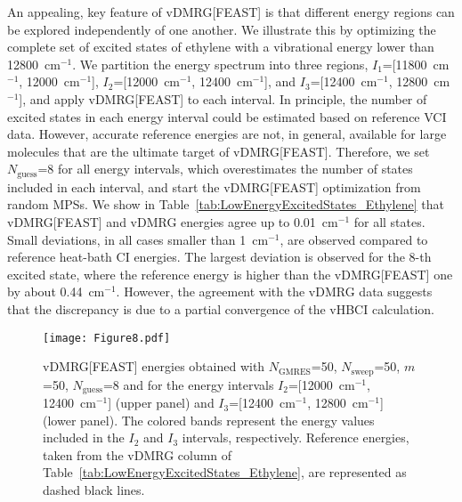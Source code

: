 \documentclass[journal=jctcce]{achemso}
\begin{document}
\noindent An appealing, key feature of vDMRG[FEAST] is that different energy regions can be explored independently of
one another.
We illustrate this by optimizing the complete set of excited states of ethylene with a vibrational energy lower than 12800~cm$^{-1}$.
We partition the energy spectrum into three regions, $I_1$=[11800~cm$^{-1}$, 12000~cm$^{-1}$], $I_2$=[12000~cm$^{-1}$, 12400~cm$^{-1}$], and $I_3$=[12400~cm$^{-1}$, 12800~cm$^{-1}$], and apply vDMRG[FEAST] to each interval.
In principle, the number of excited states in each energy interval could be estimated based on reference VCI data.\cite{Delahaye2014_EthylenePES} 
However, accurate reference energies are not, in general, available for large molecules that are the ultimate target of vDMRG[FEAST].
Therefore, we set $N_\text{guess}$=8 for all energy intervals, which overestimates the number of states included in each interval, and start the vDMRG[FEAST] optimization from random MPSs.
We show in Table~\ref{tab:LowEnergyExcitedStates_Ethylene} that vDMRG[FEAST] and vDMRG energies agree up to 0.01~cm$^{-1}$ for all states.
Small deviations, in all cases smaller than 1~cm$^{-1}$, are observed compared to reference heat-bath CI energies.\cite{Berkelbach2021_HBCI-Vibrational}
The largest deviation is observed for the 8-th excited state, where the reference energy is higher than the vDMRG[FEAST] one by about 0.44~cm$^{-1}$.
However, the agreement with the vDMRG data suggests that the discrepancy is due to a partial convergence of the vHBCI calculation.

\begin{figure}[htbp!]
  \centering
  \texttt{[image: Figure8.pdf]}
  \caption{vDMRG[FEAST] energies obtained with $N_\text{GMRES}$=50, $N_\text{sweep}$=50, $m$=50, $N_\text{guess}$=8 and for the energy intervals $I_2$=[12000~cm$^{-1}$, 12400~cm$^{-1}$] (upper panel) and $I_3$=[12400~cm$^{-1}$, 12800~cm$^{-1}$] (lower panel).
  The colored bands represent the energy values included in the $I_2$ and $I_3$ intervals, respectively.
  Reference energies, taken from the vDMRG column of Table~\ref{tab:LowEnergyExcitedStates_Ethylene}, are represented as dashed black lines.}
  \label{fig:Ethylene_ThirdLowest}
\end{figure}
\end{document}
